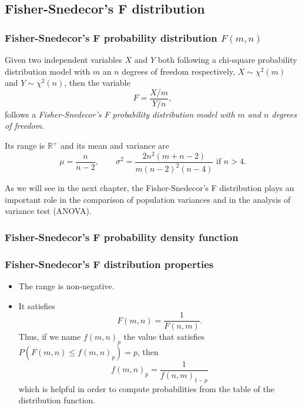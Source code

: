 \subsection{Fisher-Snedecor's F distribution}

\begin{frame}
\frametitle{Fisher-Snedecor's F probability distribution $F(m,n)$}
\begin{definition}
Given two independent variables $X$ and $Y$ both following a chi-square probability distribution model with $m$ an $n$
degrees of freedom respectively,  $X\sim \chi^2(m)$ and $Y\sim \chi^2(n)$, then the variable
\[
F = \frac{X/m}{Y/n},
\]
follows a \emph{Fisher-Snedecor's F probability distribution model with $m$ and $n$ degrees of freedom}.
\end{definition}

Its range is $\mathbb{R}^+$ and its mean and variance are
\[
\mu = \frac{n}{n-2}, \qquad \sigma^2 =\frac{2n^2(m+n−2)}{m(n-2)^2(n-4)}\mbox{ if $n>4$}.
\]

As we will see in the next chapter, the Fisher-Snedecor's F distribution plays an important role in the comparison of population variances and in the analysis of variance test (ANOVA).
\end{frame}


\begin{frame}
\frametitle{Fisher-Snedecor's F probability density function}

\begin{center}
\end{center}
\end{frame}


\begin{frame}
\frametitle{Fisher-Snedecor's F distribution properties}
\begin{itemize}
\item The range is non-negative.
\item It satisfies
\[
F(m,n) =\frac{1}{F(n,m)}.
\]
Thus, if we name $f(m,n)_p$ the value that satisfies $P(F(m,n)\leq f(m,n)_p)=p$, then
\[
f(m,n)_p =\frac{1}{f(n,m)_{1-p}}
\]
which is helpful in order to compute probabilities from the table of the distribution function.
\end{itemize}

\end{frame}

